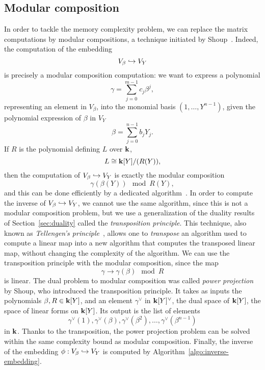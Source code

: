\subsection{Modular composition}
\label{sec:modular-composition}

In order to tackle the memory complexity problem, we can replace the matrix
computations by modular compositions, a technique initiated by
Shoup~\cite{Shoup94, Shoup95, Shoup99}. Indeed, the computation of the embedding
\[
  V_\beta\hookrightarrow V_Y
\]
is precisely a modular composition computation: we want to express a polynomial
\[
  \gamma = \sum_{j=0}^{m-1}c_j\beta^j,
\]
representing an element in $V_\beta$, into the monomial basis $(1, \dots,
Y^{n-1})$, given the polynomial expression of $\beta$ in $V_Y$
\[
  \beta = \sum_{j=0}^{n-1}b_j Y_j.
\]
If $R$ is the polynomial defining $L$ over $\mathbf{k}$, \ie
\[
  L \cong \mathbf{k}[Y]/(R(Y)),
\]
then the computation of $V_\beta\hookrightarrow V_Y$ is exactly the modular composition
\[
  \gamma(\beta(Y))\mod R(Y),
\]
and this can be done efficiently by a dedicated algorithm~\cite{KU08}.
In order to compute the inverse of $V_\beta\hookrightarrow V_Y$, we cannot use the same
algorithm, since this is not a modular composition problem, but we use a
generalization of the duality results of Section~\ref{sec:duality} called the
\emph{transposition principle}. This technique, also known as \emph{Tellengen's
principle}~\cite{BLS03, DeFeo10, DS10}, allows one to \emph{transpose} an
algorithm used to compute a linear map into a new algorithm that computes the
transposed linear map, without changing the complexity of the algorithm. We can
use the transposition principle with the modular composition, since the map
\[
  \gamma\to\gamma(\beta)\mod R
\]
is linear. The dual problem to modular composition was called \emph{power
projection} by Shoup, who introduced the transposition principle. It takes as
inputs the polynomials $\beta,R\in\mathbf{k}[Y]$, and an element $\gamma^\vee$ in
$\mathbf{k}[Y]^\vee$, the dual space of $\mathbf{k}[Y]$, \ie the space of linear forms on
$\mathbf{k}[Y]$. Its output is the list of elements
\[
  \gamma^\vee(1),\gamma^\vee(\beta),\gamma^\vee(\beta^2), \dots, \gamma^\vee(\beta^{n-1})
\]
in $\mathbf{k}$. Thanks to the transposition, the power projection problem can be solved
within the same complexity bound as modular composition. Finally, the inverse of
the embedding $\phi:V_\beta\hookrightarrow V_Y$ is computed by
Algorithm~\ref{algo:inverse-embedding}.
